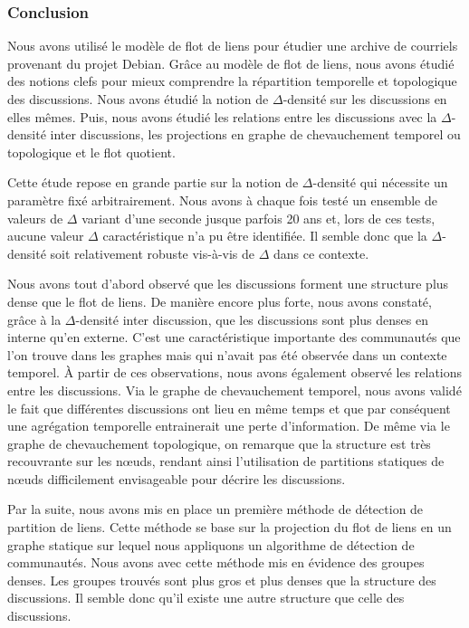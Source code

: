 \subsubsection{Conclusion}

Nous avons utilisé le modèle de flot de liens pour étudier une archive de courriels provenant du projet Debian.
Grâce au modèle de flot de liens, nous avons étudié des notions clefs pour mieux comprendre la répartition temporelle et topologique des discussions.
Nous avons étudié la notion de $\Delta$-densité sur les discussions en elles mêmes.
Puis, nous avons étudié les relations entre les discussions avec la $\Delta$-densité inter discussions, les projections en graphe de chevauchement temporel ou topologique et le flot quotient.

Cette étude repose en grande partie sur la notion de $\Delta$-densité qui nécessite un paramètre fixé arbitrairement.
Nous avons à chaque fois testé un ensemble de valeurs de $\Delta$ variant d'une seconde jusque parfois 20 ans et, lors de ces tests, aucune valeur $\Delta$ caractéristique n'a pu être identifiée.
Il semble donc que la $\Delta$-densité soit relativement robuste vis-à-vis de $\Delta$ dans ce contexte.

Nous avons tout d'abord observé que les discussions forment une structure plus dense que le flot de liens.
De manière encore plus forte, nous avons constaté, grâce à la  $\Delta$-densité inter discussion, que les discussions sont plus denses en interne qu'en externe.
C'est une caractéristique importante des communautés que l'on trouve dans les graphes mais qui n'avait pas été observée dans un contexte temporel.
\`A partir de ces observations, nous avons également observé les relations entre les discussions.
Via le graphe de chevauchement temporel, nous avons validé le fait que différentes discussions ont lieu en même temps et que par conséquent une agrégation temporelle entrainerait une perte d'information.
De même via le graphe de chevauchement topologique, on remarque que la structure est très recouvrante sur les n\oe uds, rendant ainsi l'utilisation de partitions statiques de n\oe uds difficilement envisageable pour décrire les discussions.


Par la suite, nous avons mis en place un première méthode de détection de partition de liens.
Cette méthode se base sur la projection du flot de liens en un graphe statique sur lequel nous appliquons un algorithme de détection de communautés.
Nous avons avec cette méthode mis en évidence des groupes denses.
Les groupes trouvés sont plus gros et plus denses que la structure des discussions.
Il semble donc qu'il existe une autre structure que celle des discussions.


